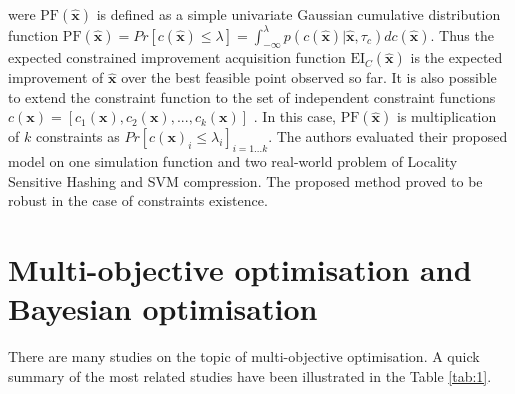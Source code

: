 were $\mathrm{PF}(\hat{\textbf{x}})$ is defined as a simple univariate Gaussian cumulative distribution function $\mathrm{PF}(\hat{\textbf{x}}) = Pr[{c}(\hat{\textbf{x}}) \leq \lambda] = \int_{-\infty}^{\lambda} p(c(\hat{\textbf{x}})|\hat{\textbf{x}},\tau_c) dc(\hat{\textbf{x}})$. 
Thus the expected constrained improvement acquisition function $\mathrm{EI}_C(\hat{\textbf{x}})$ is the expected improvement of $\hat{\textbf{x}}$ over the best feasible point observed so far. It is also possible to extend the constraint function to the set of independent constraint functions $c(\textbf{x}) = [c_1(\textbf{x}), c_2(\textbf{x}),...,c_k(\textbf{x})]$ \cite{gardner2014bayesian}. In this case, $\mathrm{PF}(\hat{\textbf{x}})$ is multiplication of $k$ constraints as $Pr[c(\textbf{x})_i \leq \lambda_i]_{i=1...k}$. The authors evaluated their proposed model on one simulation function and two real-world problem of Locality Sensitive Hashing and SVM‌ compression. The proposed method proved to be robust in the case of constraints existence.

\section{Multi-objective optimisation and Bayesian optimisation}
There are many studies on the topic of multi-objective optimisation. A quick summary of the most related studies have been illustrated in the Table \ref{tab:1}.

